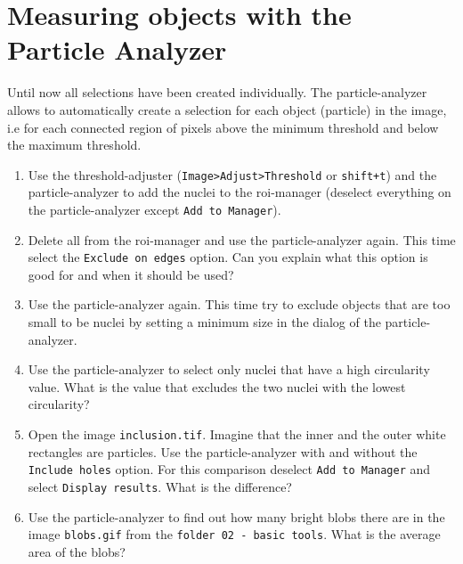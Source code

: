 \section{Measuring objects with the Particle Analyzer}

Until now all selections have been created individually. The particle-analyzer allows to automatically create a selection for each object (particle) in the image, i.e for each connected region of pixels above the minimum threshold and below the maximum threshold.

\begin{enumerate}
\item Use the threshold-adjuster (\texttt{Image>Adjust>Threshold} or \texttt{shift+t}) and the particle-analyzer to add the nuclei to the roi-manager (deselect everything on the particle-analyzer except \texttt{Add to Manager}).
\item Delete all from the roi-manager and use the particle-analyzer again. This time select the
\texttt{Exclude on edges} option. Can you explain what this option is good for and when it should be used?

\fbox{
	\begin{minipage}{\linewidth}
		\hfill\vspace{2cm}
	\end{minipage}
	}
	
\item Use the particle-analyzer again. This time try to exclude objects that are too small to be
nuclei by setting a minimum size in the dialog of the particle-analyzer.

\item Use the particle-analyzer to select only nuclei that have a high circularity value. What is the value that excludes the two nuclei with the lowest circularity?

\fbox{
	\begin{minipage}{\linewidth}
		\hfill\vspace{1cm}
	\end{minipage}
	}
	
\item Open the image \texttt{inclusion.tif}. Imagine that the inner and the outer white rectangles are particles. Use the particle-analyzer with and without the \texttt{Include holes} option. For this comparison deselect \texttt{Add to Manager} and select \texttt{Display results}. What is the difference?

\fbox{
	\begin{minipage}{\linewidth}
		\hfill\vspace{2cm}
	\end{minipage}
	}
	
\item Use the particle-analyzer to find out how many bright blobs there are in the image \texttt{blobs.gif} from the \texttt{folder 02 - basic tools}. What is the average area of the blobs?

\fbox{
	\begin{minipage}{\linewidth}
		\hfill\vspace{1cm}
	\end{minipage}
	}
\end{enumerate}

